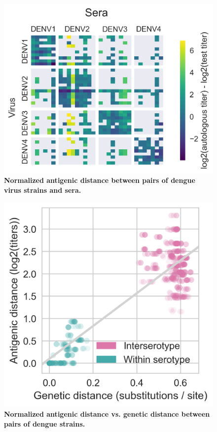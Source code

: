 \documentclass[11pt,oneside,letterpaper]{article}
\begin{document}
\begin{figure}[h]
 \centering
    \includegraphics[width=\linewidth]{../figures/png/titer_heatmap.png}
    \caption{\textbf{Normalized antigenic distance between pairs of dengue virus strains and sera.}}
     \label{titer_heatmap}
\end{figure}
\begin{figure}[h]
  \centering \includegraphics[width=\linewidth]{../figures/png/genetic_antigenic_distance.png}
  	\caption{\textbf{Normalized antigenic distance vs. genetic distance between pairs of dengue strains.}}
  	\label{genetic_antigenic_distance}
\end{figure}
\end{document}
